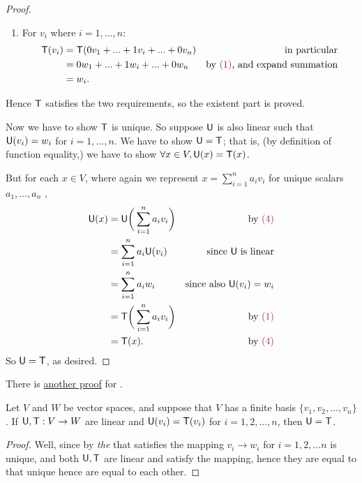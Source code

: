 \begin{proof}
\begin{enumerate}
\item
For \(v_i\) where \(i = 1, ..., n\):
\begin{align*}
    \T(v_i) & = \T(0 v_1 + ... + 1 v_i + ... + 0 v_n) & \text{in particular} \\
            & = 0 w_1 + ... + 1 w_i + ... + 0 w_n & \text{by \MAROON{(1)}, and expand summation} \\
            & = w_i.
\end{align*}
\end{enumerate}
Hence \(\textsf{T}\) satisfies the two requirements, so the existent part is proved.

Now we have to show \(\textsf{T}\) is unique.
So suppose \(\textsf{U}\) is also linear such that \(\textsf{U}(v_i) = w_i\) for \(i = 1, ..., n\).
We have to show \(\textsf{U} = \textsf{T}\);
that is, (by definition of function equality,) we have to show \(\forall x \in V, \textsf{U}(x) = \textsf{T}(x)\).

But for each \(x \in V\), where again we represent \(x = \sum_{i = 1}^n a_i v_i\) for unique scalars \(a_1, ..., a_n\) ,
\begin{align*}
    \U(x) & = \U\bigg(\sum_{i = 1}^n a_i v_i\bigg) & \text{by \MAROON{(4)}}\\
           & = \sum_{i = 1}^n a_i \U(v_i) & \text{since \(\U\) is linear} \\
           & = \sum_{i = 1}^n a_i w_i & \text{since also \(\U(v_i) = w_i\)} \\
           & = \T\bigg(\sum_{i = 1}^n a_i v_i\bigg) & \text{by \MAROON{(1)}} \\
           & = \T(x). & \text{by \MAROON{(4)}}
\end{align*}
So \(\textsf{U} = \textsf{T}\), as desired.
\end{proof}

\begin{note}
There is \href{https://www.youtube.com/watch?v=gAlUekIYKLA&ab_channel=DrPeyam}{another proof} for .
\end{note}

\begin{corollary} \label{corollary 2.6.1}
\sloppy Let \(V\) and \(W\) be vector spaces, and suppose that \(V\) has a finite basis \(\{ v_1, v_2, ..., v_n \}\).
If \(\textsf{U}, \textsf{T} : V \to W\) are linear and \(\textsf{U}(v_i) = \textsf{T}(v_i)\) for \(i = 1, 2, ..., n\), then \(\textsf{U} = \textsf{T}\).
\end{corollary}

\begin{proof}
Well, since by  \emph{the} \LTRAN{} that satisfies the mapping \(v_i \to w_i\) for \(i = 1, 2, ... n\) is unique,
and both \(\textsf{U}, \textsf{T}\) are linear and satisfy the mapping, hence they are equal to that unique \LTRAN{} hence are equal to each other.
\end{proof}


